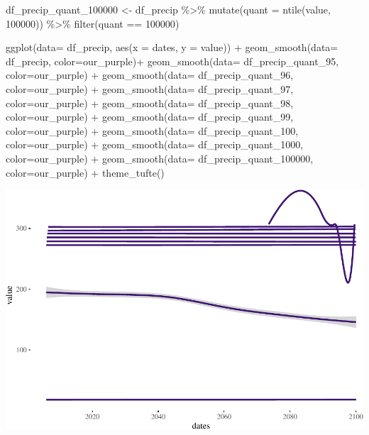 \documentclass[
  paper=a4,
  ,captions=tableheading
]{scrartcl}
\newenvironment{Shaded}{\begin{snugshade}}{\end{snugshade}}
\newcommand{\AttributeTok}[1]{\textcolor[rgb]{0.77,0.63,0.00}{#1}}
\newcommand{\DecValTok}[1]{\textcolor[rgb]{0.00,0.00,0.81}{#1}}
\newcommand{\FunctionTok}[1]{\textcolor[rgb]{0.00,0.00,0.00}{#1}}
\newcommand{\NormalTok}[1]{#1}
\newcommand{\OtherTok}[1]{\textcolor[rgb]{0.56,0.35,0.01}{#1}}
\newcommand{\SpecialCharTok}[1]{\textcolor[rgb]{0.00,0.00,0.00}{#1}}
\begin{document}
\begin{Shaded}
\begin{Highlighting}[]
\NormalTok{df\_precip\_quant\_100000 }\OtherTok{\textless{}{-}}\NormalTok{ df\_precip }\SpecialCharTok{\%\textgreater{}\%} 
  \FunctionTok{mutate}\NormalTok{(}\AttributeTok{quant =} \FunctionTok{ntile}\NormalTok{(value, }\DecValTok{100000}\NormalTok{)) }\SpecialCharTok{\%\textgreater{}\%}
  \FunctionTok{filter}\NormalTok{(quant }\SpecialCharTok{==} \DecValTok{100000}\NormalTok{)}
\end{Highlighting}
\end{Shaded}

\begin{Shaded}
\begin{Highlighting}[]
\FunctionTok{ggplot}\NormalTok{(}\AttributeTok{data=}\NormalTok{ df\_precip, }\FunctionTok{aes}\NormalTok{(}\AttributeTok{x =}\NormalTok{ dates, }\AttributeTok{y =}\NormalTok{ value)) }\SpecialCharTok{+} 
     \FunctionTok{geom\_smooth}\NormalTok{(}\AttributeTok{data=}\NormalTok{ df\_precip, }\AttributeTok{color=}\NormalTok{our\_purple)}\SpecialCharTok{+} 
     \FunctionTok{geom\_smooth}\NormalTok{(}\AttributeTok{data=}\NormalTok{ df\_precip\_quant\_95, }\AttributeTok{color=}\NormalTok{our\_purple) }\SpecialCharTok{+}
    \FunctionTok{geom\_smooth}\NormalTok{(}\AttributeTok{data=}\NormalTok{ df\_precip\_quant\_96, }\AttributeTok{color=}\NormalTok{our\_purple) }\SpecialCharTok{+}
    \FunctionTok{geom\_smooth}\NormalTok{(}\AttributeTok{data=}\NormalTok{ df\_precip\_quant\_97, }\AttributeTok{color=}\NormalTok{our\_purple) }\SpecialCharTok{+}
    \FunctionTok{geom\_smooth}\NormalTok{(}\AttributeTok{data=}\NormalTok{ df\_precip\_quant\_98, }\AttributeTok{color=}\NormalTok{our\_purple) }\SpecialCharTok{+}
    \FunctionTok{geom\_smooth}\NormalTok{(}\AttributeTok{data=}\NormalTok{ df\_precip\_quant\_99, }\AttributeTok{color=}\NormalTok{our\_purple) }\SpecialCharTok{+}
  \FunctionTok{geom\_smooth}\NormalTok{(}\AttributeTok{data=}\NormalTok{ df\_precip\_quant\_100, }\AttributeTok{color=}\NormalTok{our\_purple) }\SpecialCharTok{+}
  \FunctionTok{geom\_smooth}\NormalTok{(}\AttributeTok{data=}\NormalTok{ df\_precip\_quant\_1000, }\AttributeTok{color=}\NormalTok{our\_purple) }\SpecialCharTok{+}
    \FunctionTok{geom\_smooth}\NormalTok{(}\AttributeTok{data=}\NormalTok{ df\_precip\_quant\_100000, }\AttributeTok{color=}\NormalTok{our\_purple) }\SpecialCharTok{+}
  \FunctionTok{theme\_tufte}\NormalTok{()}
\end{Highlighting}
\end{Shaded}

\includegraphics{Haskell_files/figure-latex/unnamed-chunk-94-1.pdf}
\end{document}
